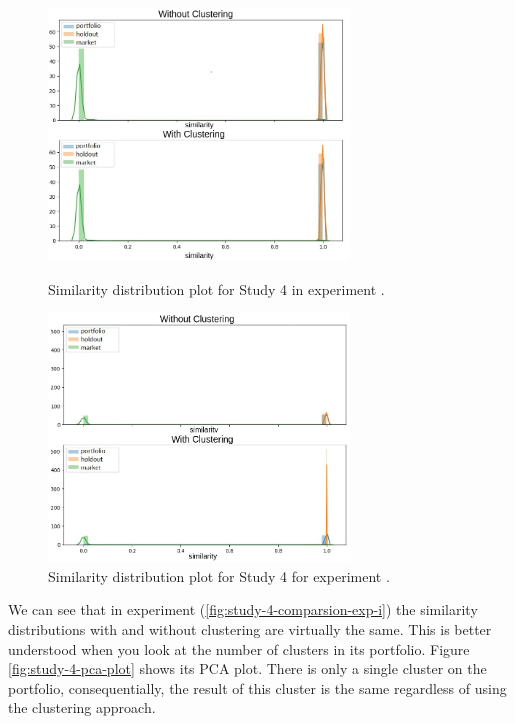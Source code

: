 \begin{figure}[!ht]
   \centering
   
   \includegraphics[width=8cm]{fig/ch4-study-4-comparsion-exp-i.png}
   \caption{Similarity distribution plot for Study 4 in experiment \nameExperimentI{}.}
   \label{fig:study-4-comparsion-exp-i}

   \includegraphics[width=8cm]{fig/ch4-study-4-comparsion-exp-ii.png}
   \caption{Similarity distribution plot for Study 4 for experiment \nameExperimentII{}.}
   \label{fig:study-4-comparsion-exp-ii}
\end{figure}

We can see that in experiment \nameExperimentI{} (\ref{fig:study-4-comparsion-exp-i}) the similarity distributions with and without clustering are virtually the same. This is better understood when you look at the number of clusters in its portfolio. Figure \ref{fig:study-4-pca-plot} shows its PCA plot. There is only a single cluster on the portfolio, consequentially, the result of this cluster is the same regardless of using the clustering approach.


